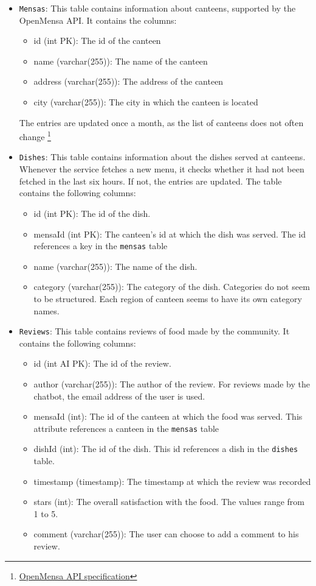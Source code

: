 \begin{itemize}
    \item \texttt{Mensas}: This table contains information about canteens, supported by the OpenMensa API. It contains the columns:
    \begin{itemize}
        \item id (int PK): The id of the canteen
        \item name (varchar(255)): The name of the canteen
        \item address (varchar(255)): The address of the canteen
        \item city (varchar(255)): The city in which the canteen is located 
    \end{itemize}
    The entries are updated once a month, as the list of canteens does not often change \footnote{\url{ OpenMensa API specification}}
    \item \texttt{Dishes}: This table contains information about the dishes served at canteens. Whenever the service fetches a new menu, it checks whether it had not been fetched in the last six hours. If not, the entries are updated. The table contains the following columns:
    \begin{itemize}
        \item id (int PK): The id of the dish. 
        \item mensaId (int PK): The canteen's id at which the dish was served. The id references a key in the \texttt{mensas} table
        \item name (varchar(255)): The name of the dish.
        \item category (varchar(255)): The category of the dish. Categories do not seem to be structured. Each region of canteen seems to have its own category names.
    \end{itemize}
    \item \texttt{Reviews}: This table contains reviews of food made by the community. It contains the following columns:
    \begin{itemize}
        \item id (int AI PK): The id of the review.
        \item author (varchar(255)): The author of the review. For reviews made by the chatbot, the email address of the user is used.
        \item mensaId (int): The id of the canteen at which the food was served. This attribute references a canteen in the \texttt{mensas} table
        \item dishId (int): The id of the dish. This id references a dish in the \texttt{dishes} table.
        \item timestamp (timestamp): The timestamp at which the review was recorded
        \item stars (int): The overall satisfaction with the food. The values range from 1 to 5.
        \item comment (varchar(255)): The user can choose to add a comment to his review.
    \end{itemize}
\end{itemize}
